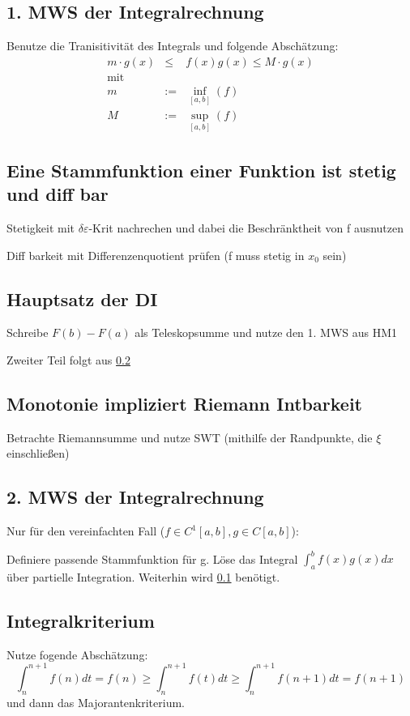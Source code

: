  \subsection{1. MWS der Integralrechnung}\label{HM2Int:1MWS}
 Benutze die Tranisitivität des Integrals und folgende Abschätzung:
 \begin{eqnarray*}
     m \cdot g(x) &\leq& f(x)g(x) \leq M \cdot g(x)\\
     \text{mit}\\
     m &:=&\inf\limits_{[a,b]}(f)\\
     M &:=&\sup\limits_{[a,b]}(f)
 \end{eqnarray*}
 \subsection{Eine Stammfunktion einer Funktion ist stetig und diff \grq bar}\label{HM2Int:StFkt}
 Stetigkeit mit $\delta\varepsilon$-Krit nachrechen und dabei die Beschränktheit von
 f ausnutzen

 Diff \grq barkeit mit Differenzenquotient prüfen (f muss stetig in $x_0$ sein)

 \subsection{Hauptsatz der DI}
 Schreibe $F(b) - F(a)$ als Teleskopsumme und nutze den 1. MWS aus HM1

 Zweiter Teil folgt aus \ref{HM2Int:StFkt}

 \subsection{Monotonie impliziert Riemann Int\grq barkeit}
 Betrachte Riemannsumme und nutze SWT (mithilfe der Randpunkte, die $\xi$ einschließen)

 \subsection{2. MWS der Integralrechnung}
 Nur für den vereinfachten Fall ($f \in C^1[a,b], g \in C[a,b]$):

 Definiere passende Stammfunktion für g. Löse das Integral $\int_a^b f(x)g(x) dx$
 über partielle Integration. Weiterhin wird \ref{HM2Int:1MWS} benötigt.

 \subsection{Integralkriterium}
 Nutze fogende Abschätzung:
 \begin{equation*}
     \int_n^{n+1}f(n)dt = f(n) \geq \int_n^{n+1}f(t)dt \geq \int_n^{n+1}f(n+1)dt = f(n+1)
 \end{equation*}
 und dann das Majorantenkriterium.

